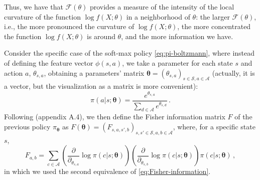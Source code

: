 Thus, we have that $\mathcal F(\theta)$ provides a measure of the intensity of the local curvature of the function $\log f(X; \theta)$ in a neighborhood of $\theta$: the larger $\mathcal F(\theta)$, i.e., the more pronounced the curvature of $\log f(X; \theta)$, the more concentrated the function $\log f(X; \theta)$ is around $\theta$, and the more information we have.

Consider the specific case of the soft-max policy \eqref{eq:pi-boltzmann}, where instead of defining the feature vector $\phi(s,a)$, we take a parameter for each state $s$ and action $a$, $\theta_{s,a}$, obtaining a parameters' matrix $\boldsymbol \theta = (\theta_{s,a})_{s \in \mathcal S, a \in \mathcal A}$ (actually, it is a vector, but the visualization as a matrix is more convenient):
\begin{equation}
    \pi(a|s; \boldsymbol \theta) = \frac{e^{\theta_{s,a}}}{\sum_{d \in \mathcal A} e^{\theta_{s,d}}} \, .
\end{equation}
Following \cite{Hennes2020} (appendix A.4), we then define the Fisher information matrix $F$ of the previous policy $\pi_{\boldsymbol \theta}$ as $F(\boldsymbol \theta) = (F_{s,a,s',b})_{s,s' \in \mathcal S, a,b \in \mathcal A}$, where, for a specific state $s$,
\begin{equation}
    F_{a,b} = \sum_{c \in \mathcal A} \left( \frac{\partial}{\partial_{\theta_{s,a}}} \log \pi(c|s; \boldsymbol \theta) \right) \left( \frac{\partial}{\partial_{\theta_{s,b}}} \log \pi(c|s; \boldsymbol \theta) \right) \pi(c|s; \boldsymbol \theta) \, ,
    \label{eq:Fisher-matrix}
\end{equation}
in which we used the second equivalence of \eqref{eq:Fisher-information}.

